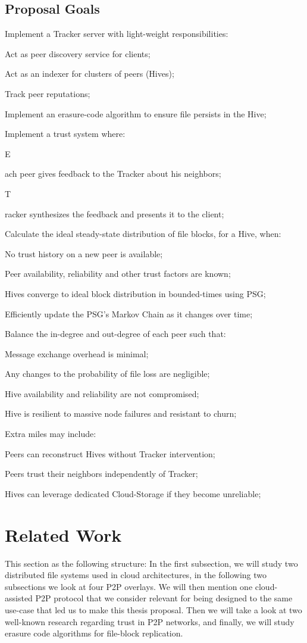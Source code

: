 \documentclass[runningheads]{llncs}
\newcommand{\SubItem}[1]{{\setlength\itemindent{15pt} \item[-] #1}}
\begin{document}
\subsection{Proposal Goals}\label{subsec:intro}
\begin{itemize}
    \item Implement a Tracker server with light-weight responsibilities:
        \SubItem{Act as peer discovery service for clients;}
        \SubItem{Act as an indexer for clusters of peers (Hives);}
        \SubItem{Track peer reputations;}
    \item Implement an erasure-code algorithm to ensure file persists in the Hive;
    \item Implement a trust system where:
        \SubItem Each peer gives feedback to the Tracker about his neighbors;
        \SubItem Tracker synthesizes the feedback and presents it to the client;
    \item Calculate the ideal steady-state distribution of file blocks, for a Hive, when:
        \SubItem{No trust history on a new peer is available;}
        \SubItem{Peer availability, reliability and other trust factors are known;}
    \item Hives converge to ideal block distribution in bounded-times using PSG;
    \item Efficiently update the PSG's Markov Chain as it changes over time;
    \item Balance the in-degree and out-degree of each peer such that:
        \SubItem{Message exchange overhead is minimal;}
        \SubItem{Any changes to the probability of file loss are negligible;}
        \SubItem{Hive availability and reliability are not compromised;}
        \SubItem{Hive is resilient to massive node failures and resistant to churn;}
    \item Extra miles may include:
        \SubItem{Peers can reconstruct Hives without Tracker intervention;}
        \SubItem{Peers trust their neighbors independently of Tracker;}
        \SubItem{Hives can leverage dedicated Cloud-Storage if they become unreliable;}
\end{itemize}

\newpage\section{Related Work}\label{sec:relatedwork}
This section as the following structure: In the first subsection, we will study two distributed file systems used in cloud architectures, in the following two subsections we look at four P2P overlays. We will then mention one cloud-assisted P2P protocol that we consider relevant for being designed to the same use-case that led us to make this thesis proposal. Then we will take a look at two well-known research regarding trust in P2P networks, and finally, we will study erasure code algorithms for file-block replication.
\end{document}
